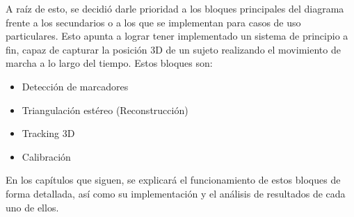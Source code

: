  A raíz de esto, se decidió darle prioridad a los bloques principales del diagrama frente a los secundarios o a los que se implementan para casos de uso particulares. Esto apunta a lograr tener implementado un sistema de principio a fin, capaz de capturar la posición 3D de un sujeto realizando el movimiento de marcha a lo largo del tiempo. Estos bloques son:
 \begin{itemize}
 	\item Detección de marcadores
 	\item Triangulación estéreo (Reconstrucción)
 	\item Tracking 3D
 	\item Calibración
 \end{itemize}

En los capítulos que siguen, se explicará el funcionamiento de estos bloques de forma detallada, así como su implementación y el análisis de resultados de cada uno de ellos.